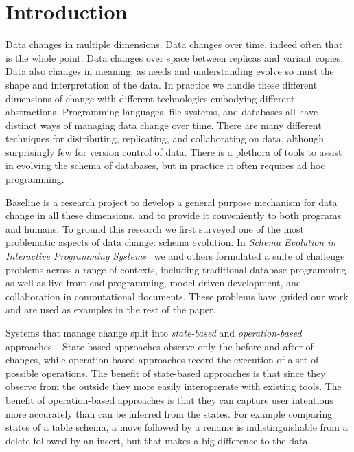 \documentclass[english,submission]{programming}
\theoremstyle{definition}
\begin{document}



\section{Introduction}

Data changes in multiple dimensions. Data changes over time, indeed often that is the whole point. Data changes over space between replicas and variant copies. Data also changes in meaning: as needs and understanding evolve so must the shape and interpretation of the data. In practice we handle these different dimensions of change with different technologies embodying different abstractions. Programming languages, file systems, and databases all have distinct ways of managing data change over time. There are many different techniques for distributing, replicating, and collaborating on data, although surprisingly few for version control of data. There is a plethora of tools to assist in evolving the schema of databases, but in practice it often requires ad hoc programming.

Baseline is a research project to develop a general purpose mechanism for data change in all these dimensions, and to provide it conveniently to both programs and humans.
To ground this research we first surveyed one of the most problematic aspects of data change: schema evolution. In \textit{Schema Evolution in Interactive Programming Systems}~\cite{challenge-problems} we and others formulated a suite of challenge problems across a range of contexts, including traditional database programming as well as live front-end programming, model-driven development, and collaboration in computational documents. These problems have guided our work and are used as examples in the rest of the paper.

Systems that manage change split into \textit{state-based} and \textit{operation-based} approaches~\cite{diff3, Shapiro11, edit-lenses}. State-based approaches observe only the before and after of changes, while operation-based approaches record the execution of a set of possible operations.
The benefit of state-based approaches is that since they observe from the outside they more easily interoprerate with existing tools.
The benefit of operation-based approaches is that they can capture user intentions more accurately than can be inferred from the states. For example comparing states of a table schema, a move followed by a rename is indistinguishable from a delete followed by an insert, but that makes a big difference to the data.
\end{document}
